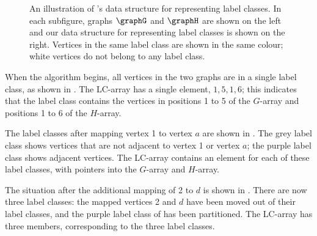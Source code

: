 \begin{figure}[htb]
{   
        \label{subfig:data-structure-c}
    }
\caption{An illustration of \McSplit's data structure for representing label classes. In each subfigure,
graphs $\graphG$ and $\graphH$ are shown on the left and our data structure for representing label classes
is shown on the right. Vertices in the same label class are shown in the same colour; white vertices
do not belong to any label class.}
\label{fig:data-structure}
\end{figure}

When the algorithm begins, all vertices in the two graphs are in a single label class, as
shown in .  The LC-array has a single element, $1,5,1,6$; this indicates
that the label class contains the vertices in positions 1 to 5 of the $G$-array and positions 1 to 6
of the $H$-array.

The label classes after mapping vertex 1 to vertex $a$ are shown in .
The grey label class shows vertices that are not adjacent to vertex 1 or vertex $a$; the purple
label class shows adjacent vertices.  The LC-array contains an element for each of these label
classes, with pointers into the $G$-array and $H$-array.

The situation after the additional mapping of 2 to $d$ is shown in .
There are now three label classes: the mapped vertices 2 and $d$ have been
moved out of their label classes, and the purple label class of 
has been partitioned. The LC-array has three members,
corresponding to the three label classes.

